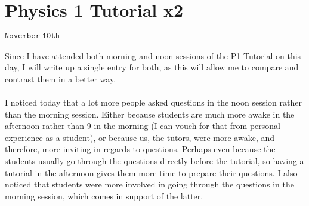 \section{Physics 1 Tutorial x2}
\begin{flushright}
$\mathtt{November \; 10th}$
\end{flushright}
\paragraph{}

Since I have attended both morning and noon sessions of the P1 Tutorial on this day, I will write up a single entry for both, as this will allow me to compare and contrast them in a better way.

\paragraph{}I noticed today that a lot more people asked questions in the noon session rather than the morning session. Either because students are much more awake in the afternoon rather than 9 in the morning (I can vouch for that from personal experience as a student), or because us, the tutors, were more awake, and therefore, more inviting in regards to questions. Perhaps even because the students usually go through the questions directly before the tutorial, so having a tutorial in the afternoon gives them more time to prepare their questions. I also noticed that students were more involved in going through the questions in the morning session, which comes in support of the latter. 